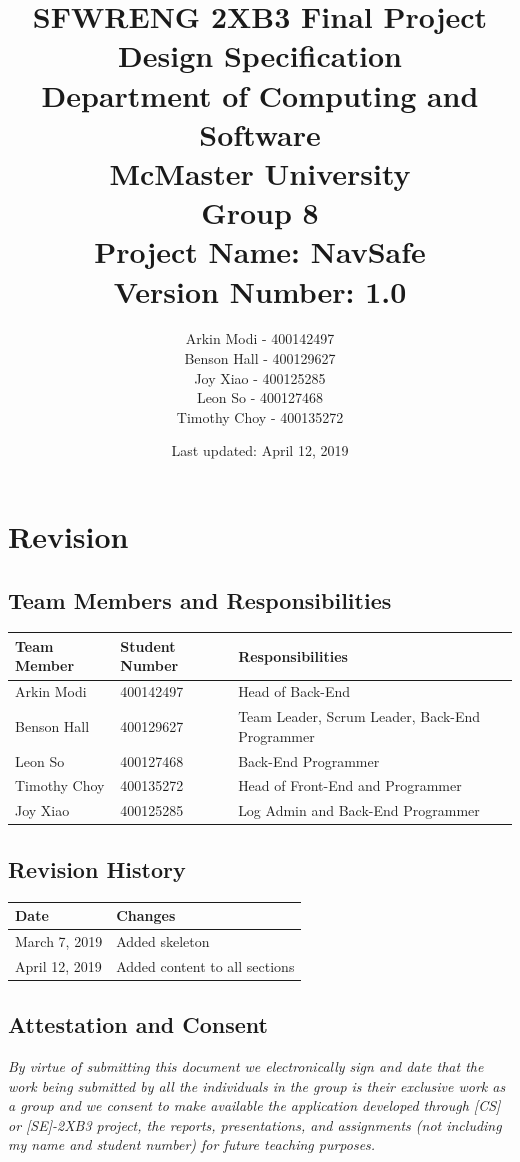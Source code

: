 \documentclass[12pt]{article}
\title{
    SFWRENG 2XB3 Final Project \\
    \large Design Specification\\
    \vspace{1ex}
    \large Department of Computing and Software\\
    \large McMaster University\\
    \vspace{1ex}
    \large Group 8\\
    \large Project Name: NavSafe\\
    \large Version Number: 1.0
}
\author{
    Arkin Modi - 400142497\\
    Benson Hall - 400129627\\
    Joy Xiao - 400125285\\
    Leon So - 400127468\\
    Timothy Choy - 400135272
}
\date{Last updated: April 12, 2019}
\begin{document}
\maketitle
\newpage

\section{Revision}
    \subsection{Team Members and Responsibilities}
    \begin{tabular}{|l|l|l|}
    \hline
    \textbf{Team Member} & \textbf{Student Number} & \textbf{Responsibilities}\\
    \hline
    Arkin Modi & 400142497 & Head of Back-End\\
    \hline
    Benson Hall & 400129627 & Team Leader, Scrum Leader, Back-End Programmer\\
    \hline
    Leon So & 400127468 & Back-End Programmer\\
    \hline
    Timothy Choy & 400135272 & Head of Front-End and Programmer\\
    \hline
    Joy Xiao & 400125285 & Log Admin and Back-End Programmer\\
    \hline
    \end{tabular}

    \subsection{Revision History}
    \begin{tabular}{|l|l|}
        \hline
        \textbf{Date} & \textbf{Changes}\\
        \hline
        March 7, 2019 & Added skeleton\\
        \hline
        April 12, 2019 & Added content to all sections\\
        \hline
    \end{tabular}

    \subsection{Attestation and Consent}
    \textit{By virtue of submitting this document we electronically sign and date that the work being submitted by all the individuals in the group is their exclusive work as a group and we consent to make available the application developed through [CS] or [SE]-2XB3 project, the reports, presentations, and assignments (not including my name and student number) for future teaching purposes.}
\newpage
\end{document}
